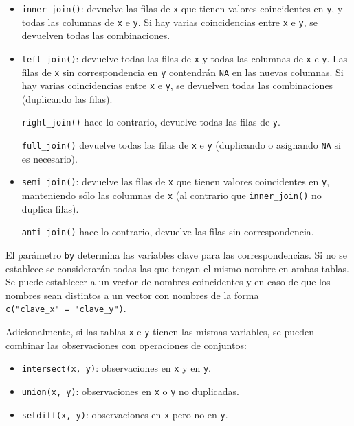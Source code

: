 \documentclass[
]{book}
\theoremstyle{break}
\theoremstyle{nonumberplain}
\begin{document}
\begin{itemize}
\item
  \texttt{inner\_join()}: devuelve las filas de \texttt{x} que tienen valores coincidentes en \texttt{y},
  y todas las columnas de \texttt{x} e \texttt{y}. Si hay varias coincidencias entre \texttt{x} e \texttt{y},
  se devuelven todas las combinaciones.
\item
  \texttt{left\_join()}: devuelve todas las filas de \texttt{x} y todas las columnas de \texttt{x} e \texttt{y}.
  Las filas de \texttt{x} sin correspondencia en \texttt{y} contendrán \texttt{NA} en las nuevas columnas.
  Si hay varias coincidencias entre \texttt{x} e \texttt{y}, se devuelven todas las combinaciones
  (duplicando las filas).

  \texttt{right\_join()} hace lo contrario, devuelve todas las filas de \texttt{y}.

  \texttt{full\_join()} devuelve todas las filas de \texttt{x} e \texttt{y} (duplicando o asignando \texttt{NA} si es necesario).
\item
  \texttt{semi\_join()}: devuelve las filas de \texttt{x} que tienen valores coincidentes en \texttt{y},
  manteniendo sólo las columnas de \texttt{x} (al contrario que \texttt{inner\_join()} no duplica filas).

  \texttt{anti\_join()} hace lo contrario, devuelve las filas sin correspondencia.
\end{itemize}

El parámetro \texttt{by} determina las variables clave para las correspondencias.
Si no se establece se considerarán todas las que tengan el mismo nombre en ambas tablas.
Se puede establecer a un vector de nombres coincidentes y en caso de que los nombres sean distintos a un vector con nombres de la forma \texttt{c("clave\_x"\ =\ "clave\_y")}.

Adicionalmente, si las tablas \texttt{x} e \texttt{y} tienen las mismas variables, se pueden combinar las observaciones con operaciones de conjuntos:

\begin{itemize}
\item
  \texttt{intersect(x,\ y)}: observaciones en \texttt{x} y en \texttt{y}.
\item
  \texttt{union(x,\ y)}: observaciones en \texttt{x} o \texttt{y} no duplicadas.
\item
  \texttt{setdiff(x,\ y)}: observaciones en \texttt{x} pero no en \texttt{y}.
\end{itemize}
\end{document}
